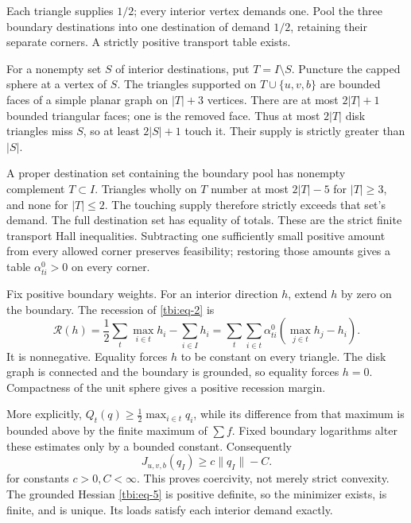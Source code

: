 Each triangle supplies \(1/2\); every interior vertex demands one. Pool the three boundary destinations into one destination of demand \(1/2\), retaining their separate corners. A strictly positive transport table exists.

For a nonempty set \(S\) of interior destinations, put \(T=I\setminus S\). Puncture the capped sphere at a vertex of \(S\). The triangles supported on \(T\cup\{u,v,b\}\) are bounded faces of a simple planar graph on \(|T|+3\) vertices. There are at most \(2|T|+1\) bounded triangular faces; one is the removed face. Thus at most \(2|T|\) disk triangles miss \(S\), so at least \(2|S|+1\) touch it. Their supply is strictly greater than \(|S|\).

A proper destination set containing the boundary pool has nonempty complement \(T\subset I\). Triangles wholly on \(T\) number at most \(2|T|-5\) for \(|T|\ge3\), and none for \(|T|\le2\). The touching supply therefore strictly exceeds that set's demand. The full destination set has equality of totals. These are the strict finite transport Hall inequalities. Subtracting one sufficiently small positive amount from every allowed corner preserves feasibility; restoring those amounts gives a table \(\alpha^0_{ti}>0\) on every corner.

Fix positive boundary weights. For an interior direction \(h\), extend \(h\) by zero on the boundary. The recession of \eqref{tbi:eq-2} is
\begin{equation}\label{tbi:eq-6}
\mathcal R(h)=\frac12\sum_t\max_{i\in t}h_i-\sum_{i\in I}h_i
=\sum_t\sum_{i\in t}\alpha^0_{ti}
                  \left(\max_{j\in t}h_j-h_i\right).
\end{equation}
It is nonnegative. Equality forces \(h\) to be constant on every triangle. The disk graph is connected and the boundary is grounded, so equality forces \(h=0\). Compactness of the unit sphere gives a positive recession margin.

More explicitly, \(Q_t(q)\ge\frac12\max_{i\in t}q_i\), while its difference from that maximum is bounded above by the finite maximum of \(\sum f\). Fixed boundary logarithms alter these estimates only by a bounded constant. Consequently
\begin{equation}\label{tbi:eq-7}
J_{u,v,b}(q_I)\ge c\lVert q_I\rVert-C.
\end{equation}
for constants \(c>0,C<\infty\). This proves coercivity, not merely strict convexity. The grounded Hessian \eqref{tbi:eq-5} is positive definite, so the minimizer exists, is finite, and is unique. Its loads satisfy each interior demand exactly.

